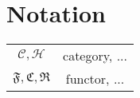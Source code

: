 \chapter{Notation}
\begin{tabular}{c c}
    $\mathcal{C,H}$ & category, ... \\
    $\mathfrak{F,C,R}$ & functor, ... \\ 
\end{tabular}